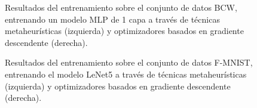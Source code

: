 \begin{figure}[!tbp]
  \centering
  \hfill
  \caption{Resultados del entrenamiento sobre el conjunto de datos BCW, entrenando un modelo MLP de 1 capa a través de técnicas metaheurísticas (izquierda) y optimizadores basados en gradiente descendente (derecha).}
\label{fig:resgen1}
\end{figure}


\begin{figure}[!tbp]
\label{fig:resgen2}
  \centering
  \hfill
  \caption{Resultados del entrenamiento sobre el conjunto de datos F-MNIST, entrenando el modelo LeNet5 a través de técnicas metaheurísticas (izquierda) y optimizadores basados en gradiente descendente (derecha).}
\end{figure}


